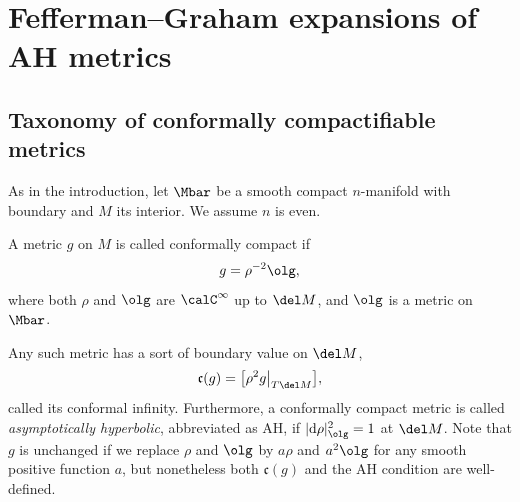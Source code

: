 \section{Fefferman--Graham expansions of AH metrics} \label {FGofAH}

\subsection{Taxonomy of conformally compactifiable metrics}
As in the introduction, let $\Mbar$ be a smooth compact $n$-manifold with boundary and $M$ its interior. We assume $n$ is even.

A metric $g$ on $M$ is called conformally compact if
\begin{gather*}%
g = \rho^{-2} \olg ,
\end{gather*}
where both $\rho$ and $\olg$ are $\calC^\infty$ up to $\del M$, and $\olg$ is a metric on $\Mbar$.

Any such metric has a sort of boundary value on $\del M$,
\begin{gather*}%
\mathfrak c(g) = \big[ \rho^2 g \big|_{T\del M} \big],
\end{gather*}
called its conformal infinity. Furthermore, a conformally compact metric is called \emph{asymptotically hyperbolic},
abbreviated as AH, if $|{\rm d}\rho|^2_{\olg} = 1$ at $\del M$. Note that $g$ is unchanged if we replace $\rho$ and $\olg$
by $a\rho$ and $a^2 \olg$ for any smooth positive function $a$, but nonetheless both $\mathfrak c(g)$ and the AH condition are well-defined.

